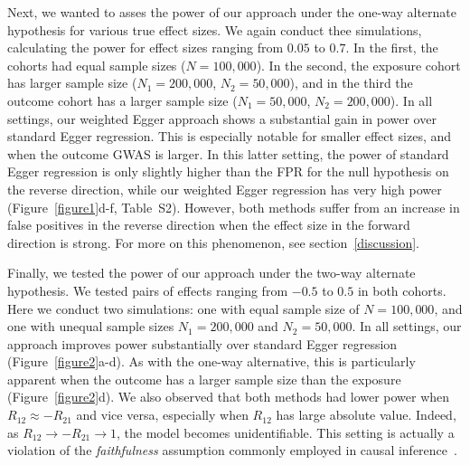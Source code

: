 \documentclass{article}
\begin{document}
Next, we wanted to asses the power of our approach under the one-way alternate
hypothesis for various true effect sizes. We again conduct thee simulations,
calculating the power for effect sizes ranging from $0.05$ to $0.7$.
In the first, the cohorts had equal sample sizes ($N = 100,000$). In the second, the exposure
cohort has larger sample size ($N_1 = 200,000$, $N_2 = 50,000$),
and in the third the outcome cohort has a larger sample size ($N_1 = 50,000$, $N_2 = 200,000$).
In all settings, our weighted Egger approach shows
a substantial gain in power over standard Egger regression. This is especially
notable for smaller effect sizes, and when the outcome GWAS is larger.
In this latter setting, the power of standard Egger regression is only slightly
higher than the FPR for the null hypothesis on the reverse direction,
while our weighted Egger regression has very high power
(Figure~\ref{figure1}d-f, Table~S2). However, both
methods suffer from an increase in false positives in the reverse direction
when the effect size in the forward direction is strong. For more on this
phenomenon, see section~\ref{discussion}.

Finally, we tested the power of our approach under the two-way alternate
hypothesis. We tested pairs of effects ranging from $-0.5$ to $0.5$ in both cohorts.
Here we conduct two simulations: one with equal sample size of $N=100,000$,
and one with unequal sample sizes $N_1 = 200,000$ and $N_2 = 50,000$.
In all settings, our approach improves power
substantially over standard Egger regression (Figure~\ref{figure2}a-d). As with
the one-way alternative, this is particularly apparent when the outcome has a larger
sample size than the exposure (Figure~\ref{figure2}d). We also observed that both
methods had lower power when $R_{12} \approx -R_{21}$ and vice versa, especially when
$R_{12}$ has large absolute value. Indeed, as $R_{12} \rightarrow -R_{21} \rightarrow 1$, the model
becomes unidentifiable. This setting is actually a violation of the \emph{faithfulness}
assumption commonly employed in causal inference~\cite{Pearl2000}.
\end{document}
